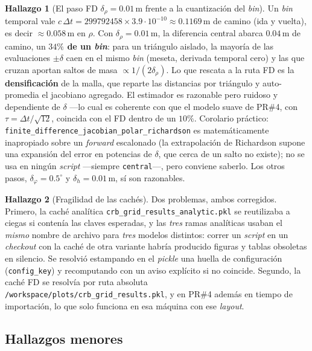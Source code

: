 \documentclass[11pt,a4paper]{article}
\newcommand{\code}[1]{\texttt{#1}}
\theoremstyle{definition}
\newtheorem{finding}{Hallazgo}
\begin{document}
\begin{finding}[El paso FD $\delta_\rho=0.01\,$m frente a la cuantización del
\emph{bin}]
\label{find:paso-fd}
Un \emph{bin} temporal vale $c\,\Delta t = 299792458\times3.9\cdot10^{-10}
\approx 0.1169\,$m de camino (ida y vuelta), es decir $\approx0.058\,$m en
$\rho$. Con $\delta_\rho=0.01\,$m, la diferencia central abarca $0.04\,$m de
camino, un \textbf{$34\%$ de un \emph{bin}}: para un triángulo aislado, la
mayoría de las evaluaciones $\pm\delta$ caen en el mismo \emph{bin} (meseta,
derivada temporal cero) y las que cruzan aportan saltos de masa $\propto
1/(2\delta_\rho)$. Lo que rescata a la ruta FD es la \textbf{densificación} de
la malla, que reparte las distancias por triángulo y auto-promedia el jacobiano
agregado. El estimador es razonable pero ruidoso y dependiente de $\delta$ ---lo
cual es coherente con que el modelo suave de PR\#4, con
$\tau=\Delta t/\sqrt{12}$, coincida con el FD dentro de un $10\%$.
Corolario práctico: \code{finite\_difference\_jacobian\_polar\_richardson} es
matemáticamente inapropiado sobre un \emph{forward} escalonado (la
extrapolación de Richardson supone una expansión del error en potencias de
$\delta$, que cerca de un salto no existe); no se usa en ningún \emph{script}
---siempre \code{central}---, pero conviene saberlo. Los otros pasos,
$\delta_\varphi=0.5^\circ$ y $\delta_h=0.01\,$m, sí son razonables.
\end{finding}

\begin{finding}[Fragilidad de las cachés]
\label{find:cache}
Dos problemas, ambos corregidos. Primero, la caché analítica
\code{crb\_grid\_results\_analytic.pkl} se reutilizaba a ciegas si contenía las
claves esperadas, y las \emph{tres} ramas analíticas usaban el \emph{mismo}
nombre de archivo para \emph{tres} modelos distintos: correr un \emph{script}
en un \emph{checkout} con la caché de otra variante habría producido figuras y
tablas obsoletas en silencio. Se resolvió estampando en el \emph{pickle} una
huella de configuración (\code{config\_key}) y recomputando con un aviso
explícito si no coincide. Segundo, la caché FD se resolvía por ruta absoluta
\code{/workspace/plots/crb\_grid\_results.pkl}, y en PR\#4 además en tiempo de
importación, lo que solo funciona en esa máquina con ese \emph{layout}.
\end{finding}

\subsection{Hallazgos menores}
\end{document}
